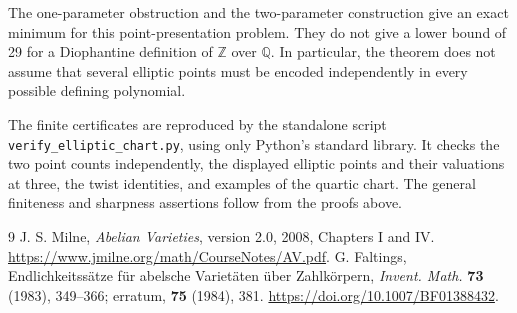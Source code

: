\documentclass[11pt,a4paper]{article}
\theoremstyle{definition}\newtheorem{definition}[theorem]{Definition}
\begin{document}
The one-parameter obstruction and the two-parameter construction
give an exact minimum for this point-presentation problem. They
do not give a lower bound of 29 for a Diophantine definition of
$\mathbb Z$ over $\mathbb Q$. In particular, the theorem does not
assume that several elliptic points must be encoded independently
in every possible defining polynomial.

The finite certificates are reproduced by the standalone script
\texttt{verify\_elliptic\_chart.py}, using only Python's standard
library. It checks the two point counts independently, the displayed
elliptic points and their valuations at three, the twist identities,
and examples of the quartic chart. The general finiteness and
sharpness assertions follow from the proofs above.

\begin{thebibliography}{9}
 J. S. Milne, \emph{Abelian Varieties},
version 2.0, 2008, Chapters I and IV.
\url{https://www.jmilne.org/math/CourseNotes/AV.pdf}.
 G. Faltings,
Endlichkeitss\"atze f\"ur abelsche Variet\"aten \"uber Zahlk\"orpern,
\emph{Invent. Math.} \textbf{73} (1983), 349--366;
erratum, \textbf{75} (1984), 381.
\url{https://doi.org/10.1007/BF01388432}.
\end{thebibliography}
\end{document}
